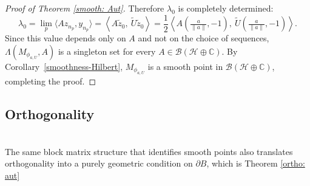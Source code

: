 \documentclass[12pt]{amsart}
\theoremstyle{definition}
\begin{document}
\begin{proof}[Proof of Theorem \ref{smooth: Aut}]
\noindent Therefore $\lambda_0$ is completely determined:
\[
\lambda_0 = \lim_p\langle Az_{n_p}, y_{n_p}\rangle 
= \left\langle A\tilde{z}_0,\ \widetilde{U}\tilde{z}_0\right\rangle
= \frac{1}{2}\left\langle A\!\left(\tfrac{a}{\|a\|}, -1\right),\ 
\widetilde{U}\!\left(\tfrac{a}{\|a\|}, -1\right)\right\rangle.
\]
Since this value depends only on $A$ and not on the choice of 
sequences, $\Lambda(M_{\phi_{a,U}}, A)$ is a singleton set for every 
$A \in \mathcal{B}(\mathcal{H} \oplus \mathbb{C})$. By 
Corollary~\ref{smoothness-Hilbert}, $M_{\phi_{a,U}}$ is a smooth point 
in $\mathcal{B}(\mathcal{H} \oplus \mathbb{C})$, completing the 
proof.
\end{proof}

\subsection{Orthogonality}\hfill\\


\noindent The same block matrix structure that identifies smooth 
points also translates orthogonality into a 
purely geometric condition on $\partial B$, which is Theorem \ref{ortho: aut}
\end{document}

